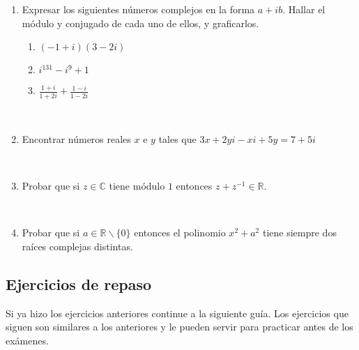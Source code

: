 \documentclass[12pt]{amsart}
\begin{document}
\begin{enumerate}

\item Expresar los siguientes n{\'u}meros complejos en la forma $a +i b$.
Hallar el m{\'o}dulo y conjugado de cada uno de ellos, y graficarlos.

\begin{multicols}{3}
\begin{enumerate}
\item $(-1+i) (3-2i)$
\item $i^{131} - i^9 +1$
\item $\frac {1+i}{1+2i} + \frac{1-i}{1-2i}$
\end{enumerate}
\end{multicols}

\


\item Encontrar n\'umeros reales $x$ e $y$ tales que $3x+2yi-xi+5y = 7 + 5i$


%

\

\item Probar que si $z \in \mathbb{C}$ tiene m\'odulo $1$ entonces $z + z^{-1} \in \mathbb{R}.$

\

\item Probar que si $a\in \mathbb{R}\backslash \{0\}$ entonces el polinomio $x^2+a^2$ tiene siempre dos ra\'ices complejas distintas.


\end{enumerate}

\subsection*{Ejercicios de repaso} Si ya hizo los ejercicios anteriores continue a la siguiente gu\'ia. Los ejercicios que siguen son similares a los anteriores y le pueden servir para practicar antes de los ex\'amenes.
\end{document}
